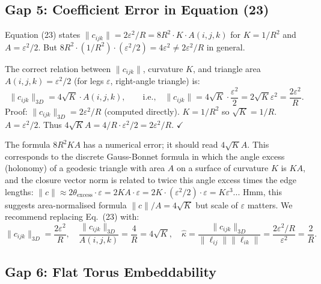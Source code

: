 \documentclass[11pt]{article}
\begin{document}
\subsection{Gap 5: Coefficient Error in Equation (23)}

\begin{gapbox}
Equation (23) states $\|c_{ijk}\| = 2\varepsilon^2/R = 8R^2 \cdot K \cdot A(i,j,k)$
for $K = 1/R^2$ and $A = \varepsilon^2/2$. But $8R^2 \cdot (1/R^2) \cdot
(\varepsilon^2/2) = 4\varepsilon^2 \ne 2\varepsilon^2/R$ in general.
\end{gapbox}

\begin{bridgebox}
The correct relation between $\|c_{ijk}\|$, curvature $K$, and triangle area
$A(i,j,k) = \varepsilon^2/2$ (for legs $\varepsilon$, right-angle triangle) is:
\[
    \|c_{ijk}\|_{3D} = 4\sqrt{K} \cdot A(i,j,k),
    \qquad\text{i.e.,}\quad
    \|c_{ijk}\| = 4\sqrt{K} \cdot \frac{\varepsilon^2}{2} = 2\sqrt{K}\varepsilon^2
    = \frac{2\varepsilon^2}{R}.
\]
Proof: $\|c_{ijk}\|_{3D} = 2\varepsilon^2/R$ (computed directly). $K = 1/R^2$
so $\sqrt{K} = 1/R$. $A = \varepsilon^2/2$. Thus $4\sqrt{K} A = 4/R \cdot
\varepsilon^2/2 = 2\varepsilon^2/R$. $\checkmark$

The formula $8R^2 K A$ has a numerical error; it should read $4\sqrt{K} A$. This
corresponds to the discrete Gauss-Bonnet formula in which the angle excess (holonomy)
of a geodesic triangle with area $A$ on a surface of curvature $K$ is $KA$, and
the closure vector norm is related to twice this angle excess times the edge lengths:
$\|c\| \approx 2\theta_{\mathrm{excess}} \cdot \varepsilon = 2KA\cdot\varepsilon =
2K \cdot (\varepsilon^2/2) \cdot \varepsilon = K\varepsilon^3$... Hmm, this suggests
area-normalised formula $\|c\|/A = 4\sqrt{K}$ but scale of $\varepsilon$ matters.
We recommend replacing Eq.\ (23) with:
\[
    \|c_{ijk}\|_{3D} = \frac{2\varepsilon^2}{R},
    \quad
    \frac{\|c_{ijk}\|_{3D}}{A(i,j,k)} = \frac{4}{R} = 4\sqrt{K},
    \quad
    \hat\kappa = \frac{\|c_{ijk}\|_{3D}}{\|\ell_{ij}\|\|\ell_{ik}\|} = \frac{2\varepsilon^2/R}{\varepsilon^2} = \frac{2}{R}.
\]
\end{bridgebox}

\subsection{Gap 6: Flat Torus Embeddability}
\end{document}
